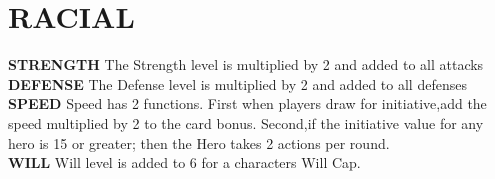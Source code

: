 \section{RACIAL}
\textbf{STRENGTH}
The Strength level is multiplied by 2 and added to all attacks\\
\textbf{DEFENSE}
The Defense level is multiplied by 2 and added to all defenses\\
\textbf{SPEED}
Speed has 2 functions.  First when players draw for initiative,add the speed multiplied by 2 to the card bonus.  Second,if the initiative value for any hero is 15 or greater; then the Hero takes 2 actions per round.\\
\textbf{WILL} Will level is added to 6 for a characters Will Cap.

